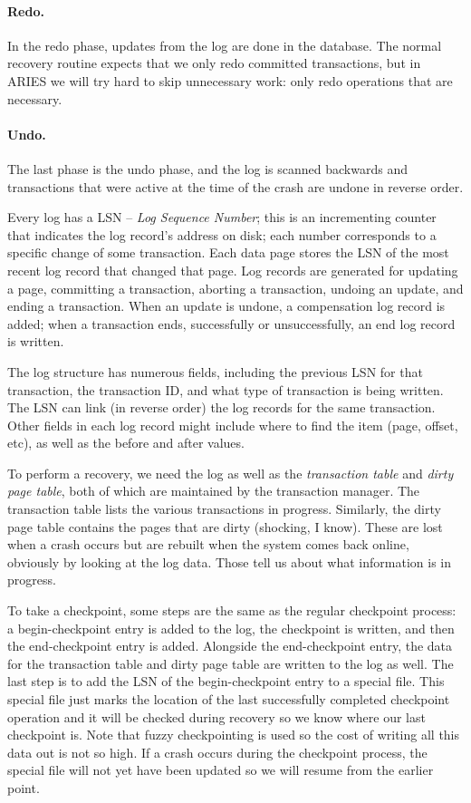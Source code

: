 \documentclass[a4paper]{report}
\begin{document}
\paragraph{Redo.} In the redo phase, updates from the log are done in the database. The normal recovery routine expects that we only redo committed transactions, but in ARIES we will try hard to skip unnecessary work: only redo operations that are necessary.

\paragraph{Undo.} The last phase is the undo phase, and the log is scanned backwards and transactions that were active at the time of the crash are undone in reverse order. 

Every log has a LSN -- \textit{Log Sequence Number}; this is an incrementing counter that indicates the log record's address on disk; each number corresponds to a specific change of some transaction. Each data page stores the LSN of the most recent log record that changed that page. Log records are generated for updating a page, committing a transaction, aborting a transaction, undoing an update, and ending a transaction.  When an update is undone, a compensation log record is added; when a transaction ends, successfully or unsuccessfully, an end log record is written. 

The log structure has numerous fields, including the previous LSN for that transaction, the transaction ID, and what type of transaction is being written. The LSN can link (in reverse order) the log records for the same transaction. Other fields in each log record might include where to find the item (page, offset, etc), as well as the before and after values.

To perform a recovery, we need the log as well as the \textit{transaction table} and \textit{dirty page table}, both of which are maintained by the transaction manager. The transaction table lists the various transactions in progress. Similarly, the dirty page table contains the pages that are dirty (shocking, I know). These are lost when a crash occurs but are rebuilt when the system comes back online, obviously by looking at the log data. Those tell us about what information is in progress.

To take a checkpoint, some steps are the same as the regular checkpoint process: a begin-checkpoint entry is added to the log, the checkpoint is written, and then the end-checkpoint entry is added. Alongside the end-checkpoint entry, the data for the transaction table and dirty page table are written to the log as well. The last step is to add the LSN of the begin-checkpoint entry to a special file. This special file just marks the location of the last successfully completed checkpoint operation and it will be checked during recovery so we know where our last checkpoint is. Note that fuzzy checkpointing is used so the cost of writing all this data out is not so high. If a crash occurs during the checkpoint process, the special file will not yet have been updated so we will resume from the earlier point.
\end{document}
